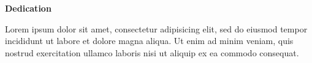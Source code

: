 
\clearpage
\begin{adjustwidth}{0.1\textwidth}{0.1\textwidth}
\begingroup
\null\vspace{0.2\textheight}
\begin{center}
{\bfseries\Large Dedication}\par\vspace{2em}

Lorem ipsum dolor sit amet, consectetur adipisicing elit, sed do eiusmod tempor incididunt ut labore et dolore magna aliqua. Ut enim ad minim veniam, quis nostrud exercitation ullamco laboris nisi ut aliquip ex ea commodo consequat.
\end{center}
\endgroup
\end{adjustwidth}
\clearpage